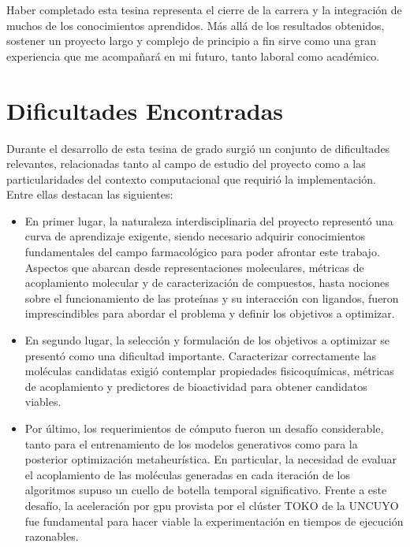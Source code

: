 Haber completado esta tesina representa el cierre de la carrera y la integración de muchos de los conocimientos aprendidos. Más allá de los resultados obtenidos, sostener un proyecto largo y complejo de principio a fin sirve como una gran experiencia que me acompañará en mi futuro, tanto laboral como académico.

\section{Dificultades Encontradas}
\label{sec:dificultades_encontradas}

Durante el desarrollo de esta tesina de grado surgió un conjunto de dificultades relevantes, relacionadas tanto al campo de estudio del proyecto como a las particularidades del contexto computacional que requirió la implementación. Entre ellas destacan las siguientes:

\begin{itemize}
    \item En primer lugar, la naturaleza interdisciplinaria del proyecto representó una curva de aprendizaje exigente, siendo necesario adquirir conocimientos fundamentales del campo farmacológico para poder afrontar este trabajo. Aspectos que abarcan desde representaciones moleculares, métricas de acoplamiento molecular y de caracterización de compuestos, hasta nociones sobre el funcionamiento de las proteínas y su interacción con ligandos, fueron imprescindibles para abordar el problema y definir los objetivos a optimizar.

    \item En segundo lugar, la selección y formulación de los objetivos a optimizar se presentó como una dificultad importante. Caracterizar correctamente las moléculas candidatas exigió contemplar propiedades fisicoquímicas, métricas de acoplamiento y predictores de bioactividad para obtener candidatos viables.

    \item Por último, los requerimientos de cómputo fueron un desafío considerable, tanto para el entrenamiento de los modelos generativos como para la posterior optimización metaheurística. En particular, la necesidad de evaluar el acoplamiento de las moléculas generadas en cada iteración de los algoritmos supuso un cuello de botella temporal significativo. Frente a este desafío, la aceleración por \gls{gpu} provista por el clúster TOKO de la UNCUYO fue fundamental para hacer viable la experimentación en tiempos de ejecución razonables.
\end{itemize}

